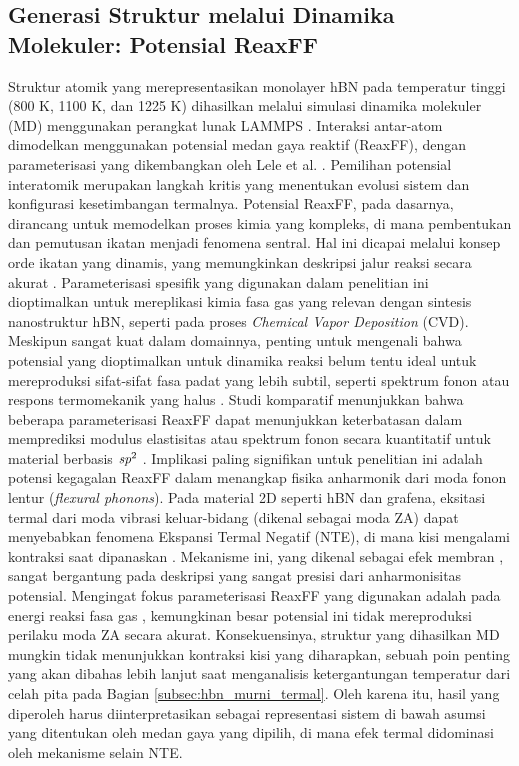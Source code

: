 \subsection{Generasi Struktur melalui Dinamika Molekuler: Potensial ReaxFF}
\label{subsec:md_reaxff}
Struktur atomik yang merepresentasikan monolayer hBN pada temperatur tinggi (800 K, 1100 K, dan 1225 K) dihasilkan melalui simulasi dinamika molekuler (MD) menggunakan perangkat lunak LAMMPS \cite{Plimpton1995}.
Interaksi antar-atom dimodelkan menggunakan potensial medan gaya reaktif (ReaxFF), dengan parameterisasi yang dikembangkan oleh Lele et al. \cite{Lele2022}.
Pemilihan potensial interatomik merupakan langkah kritis yang menentukan evolusi sistem dan konfigurasi kesetimbangan termalnya.
Potensial ReaxFF, pada dasarnya, dirancang untuk memodelkan proses kimia yang kompleks, di mana pembentukan dan pemutusan ikatan menjadi fenomena sentral.
Hal ini dicapai melalui konsep orde ikatan yang dinamis, yang memungkinkan deskripsi jalur reaksi secara akurat \cite{Weismiller2010, vanDuin2001, Senftle2016}.
Parameterisasi spesifik yang digunakan dalam penelitian ini \cite{Lele2022} dioptimalkan untuk mereplikasi kimia fasa gas yang relevan dengan sintesis nanostruktur hBN, seperti pada proses \emph{Chemical Vapor Deposition} (CVD).
Meskipun sangat kuat dalam domainnya, penting untuk mengenali bahwa potensial yang dioptimalkan untuk dinamika reaksi belum tentu ideal untuk mereproduksi sifat-sifat fasa padat yang lebih subtil, seperti spektrum fonon atau respons termomekanik yang halus \cite{Fthenakis2022, Deringer2020}.
Studi komparatif menunjukkan bahwa beberapa parameterisasi ReaxFF dapat menunjukkan keterbatasan dalam memprediksi modulus elastisitas atau spektrum fonon secara kuantitatif untuk material berbasis $\emph{sp}^2$ \cite{Fthenakis2022, Deringer2020}.
Implikasi paling signifikan untuk penelitian ini adalah potensi kegagalan ReaxFF dalam menangkap fisika anharmonik dari moda fonon lentur (\emph{flexural phonons}).
Pada material 2D seperti hBN dan grafena, eksitasi termal dari moda vibrasi keluar-bidang (dikenal sebagai moda ZA) dapat menyebabkan fenomena Ekspansi Termal Negatif (NTE), di mana kisi mengalami kontraksi saat dipanaskan \cite{Sarikurt2022, Mann2017}.
Mekanisme ini, yang dikenal sebagai efek membran \cite{Yates1972}, sangat bergantung pada deskripsi yang sangat presisi dari anharmonisitas potensial.
Mengingat fokus parameterisasi ReaxFF yang digunakan adalah pada energi reaksi fasa gas \cite{Lele2022}, kemungkinan besar potensial ini tidak mereproduksi perilaku moda ZA secara akurat.
Konsekuensinya, struktur yang dihasilkan MD mungkin tidak menunjukkan kontraksi kisi yang diharapkan, sebuah poin penting yang akan dibahas lebih lanjut saat menganalisis ketergantungan temperatur dari celah pita pada Bagian \ref{subsec:hbn_murni_termal}.
Oleh karena itu, hasil yang diperoleh harus diinterpretasikan sebagai representasi sistem di bawah asumsi yang ditentukan oleh medan gaya yang dipilih, di mana efek termal didominasi oleh mekanisme selain NTE.
